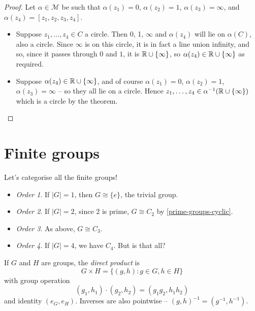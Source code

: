 \documentclass{../../template/note}
\begin{document}
    \begin{proof}
        Let \(\alpha \in \mathcal M\) be such that \(\alpha(z_1) = 0\), \(\alpha(z_2) = 1\), \(\alpha(z_3) = \infty\), and \(\alpha(z_4) = [z_1, z_2, z_3, z_4]\).
        \begin{itemize}
            \item[\(\implies\)] Suppose \(z_1, \dots, z_4 \in C\) a circle. Then 0, 1, \(\infty\) and \(\alpha(z_4)\) will lie on \(\alpha(C)\), also a circle. Since \(\infty\) is on this circle, it is in fact a line union infinity, and so, since it passes through \(0\) and \(1\), it is \(\mathbb R \cup \{\infty\}\), so \(\alpha(z_4) \in \mathbb R \cup \{\infty\}\) as required.
            \item[\(\impliedby\)] Suppose \(\alpha(z_4) \in \mathbb R \cup \{\infty\}\), and of course \(\alpha(z_1) = 0\), \(\alpha(z_2) = 1\), \(\alpha(z_3) = \infty\) -- so they all lie on a circle. Hence \(z_1, \dots, z_4 \in \alpha^{-1}(\mathbb R \cup \{\infty\})\) which is a circle by the theorem. 
        \end{itemize} 
    \end{proof}
    
    \section{Finite groups}
    
    Let's categorise all the finite groups!


    \begin{itemize}
        \item \emph{Order 1}. If \(|G| = 1\), then \(G \cong \{e\}\), the trivial group.
        \item \emph{Order 2}. If \(|G| = 2\), since 2 is prime, \(G \cong C_2\) by \cref{prime-groups-cyclic}.
        \item \emph{Order 3}. As above, \(G \cong C_3\).
        \item \emph{Order 4}. If \(|G| = 4\), we have \(C_4\). But is that all?
    \end{itemize}

    \begin{definition}
        If \(G\) and \(H\) are groups, the \emph{direct product} is
        \[
            G \times H = \{(g, h): g \in G, h \in H\}
        \]
        with group operation
        \[
            (g_1, h_1) \cdot (g_2, h_2) = (g_1g_2, h_1h_2)
        \]
        and identity \((e_G, e_H)\). Inverses are also pointwise -- \((g, h)^{-1} = (g^{-1}, h^{-1})\).
    \end{definition}
    
\end{document}
